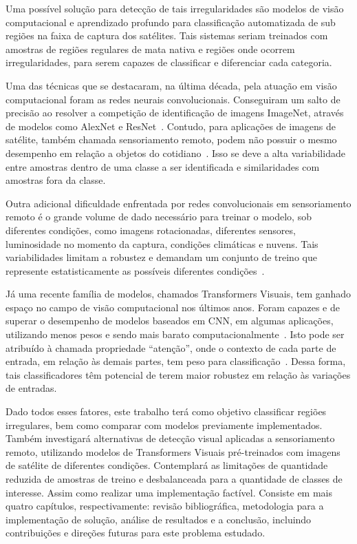 Uma possível solução para detecção de tais irregularidades são modelos de visão computacional e aprendizado profundo para classificação automatizada de sub regiões na faixa de captura dos satélites. Tais sistemas seriam treinados com amostras de regiões regulares de mata nativa e regiões onde ocorrem irregularidades, para serem capazes de classificar e diferenciar cada categoria.

Uma das técnicas que se destacaram, na última década, pela atuação em visão computacional foram as redes neurais convolucionais. Conseguiram um salto de precisão ao resolver a competição de identificação de imagens ImageNet, através de modelos como AlexNet e ResNet~\cite{alom2018history}. Contudo, para aplicações de imagens de satélite, também chamada sensoriamento remoto, podem não possuir o mesmo desempenho em relação a objetos do cotidiano~\cite{wang2022empirical}. Isso se deve a alta variabilidade entre amostras dentro de uma classe a ser identificada e similaridades com amostras fora da classe.

Outra adicional dificuldade enfrentada por redes convolucionais em sensoriamento remoto é o grande volume de dado necessário para treinar o modelo, sob diferentes condições, como imagens rotacionadas, diferentes sensores, luminosidade no momento da captura, condições climáticas e nuvens. Tais variabilidades limitam a robustez e demandam um conjunto de treino que represente estatisticamente as possíveis diferentes condições~\cite{5782957}.

Já uma recente família de modelos, chamados Transformers Visuais, tem ganhado espaço no campo de visão computacional nos últimos anos. Foram capazes e de superar o desempenho de modelos baseados em CNN, em algumas aplicações, utilizando menos pesos e sendo mais barato computacionalmente~\cite{wang2022empirical}. Isto pode ser atribuído à chamada propriedade “atenção”, onde o contexto de cada parte de entrada, em relação às demais partes, tem peso para classificação~\cite{dosovitskiy2020image}. Dessa forma, tais classificadores têm potencial de terem maior robustez em relação às variações de entradas.


Dado todos esses fatores, este trabalho terá como objetivo classificar regiões irregulares, bem como comparar com modelos previamente implementados. Também investigará alternativas de detecção visual aplicadas a sensoriamento remoto, utilizando modelos de Transformers Visuais pré-treinados com imagens de satélite de diferentes condições. Contemplará as limitações de quantidade reduzida de amostras de treino e desbalanceada para a quantidade de classes de interesse. Assim como realizar uma implementação factível. Consiste em mais quatro capítulos, respectivamente: revisão bibliográfica, metodologia para a implementação de solução, análise de resultados e a conclusão, incluindo contribuições e direções futuras para este problema estudado.




